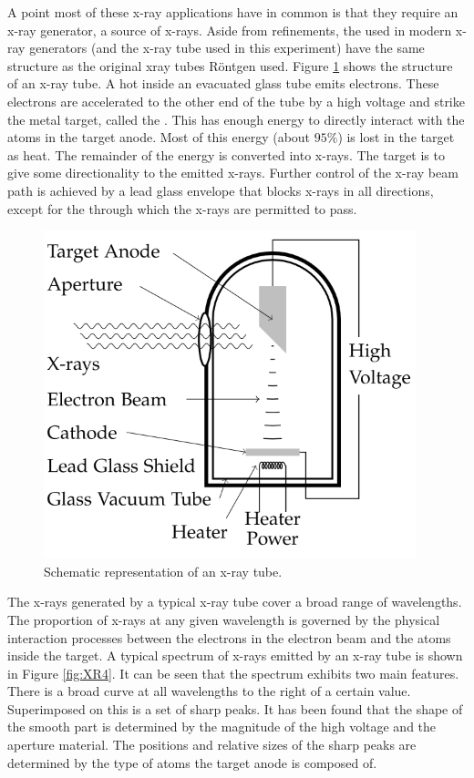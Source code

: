 \documentclass[12pt, a4paper, oneside, openright, titlepage]{book}
\begin{document}
\noindent A point most of these x-ray applications have in common is that they require an x-ray generator, a source of x-rays. Aside from refinements, the  used in modern x-ray generators (and the x-ray tube used in this experiment) have the same structure as the original xray tubes Röntgen used. Figure \ref{fig:XR3} shows the structure of an x-ray tube. A hot  inside an evacuated glass tube emits electrons. These electrons are accelerated to the other end of the tube by a high voltage and strike the metal target, called the . This  has enough energy to directly interact with the atoms in the target anode. Most of this energy (about $95\%$) is lost in the target as heat. The remainder of the energy is converted into x-rays. The target is  to give some directionality to the emitted x-rays. Further control of the x-ray beam path is achieved by a lead glass envelope that blocks x-rays in all directions, except for the  through which the x-rays are permitted to pass.

\begin{figure}[H]
    \centering
    \includegraphics[scale = 0.8]{Images/XR3.PNG}
    \caption{Schematic representation of an x-ray tube.}
    \label{fig:XR3}
\end{figure}

\noindent The x-rays generated by a typical x-ray tube cover a broad range of wavelengths. The proportion of x-rays at any given wavelength is governed by the physical interaction processes between the electrons in the electron beam and the atoms inside the target. A typical spectrum of x-rays emitted by an x-ray tube is shown in Figure \ref{fig:XR4}. It can be seen that the spectrum exhibits two main features. There is a broad curve at all wavelengths to the right of a certain value. Superimposed on this is a set of sharp peaks. It has been found that the shape of the smooth part is determined by the magnitude of the high voltage and the aperture material. The positions and relative sizes of the sharp peaks are determined by the type of atoms the target anode is composed of.
\end{document}
